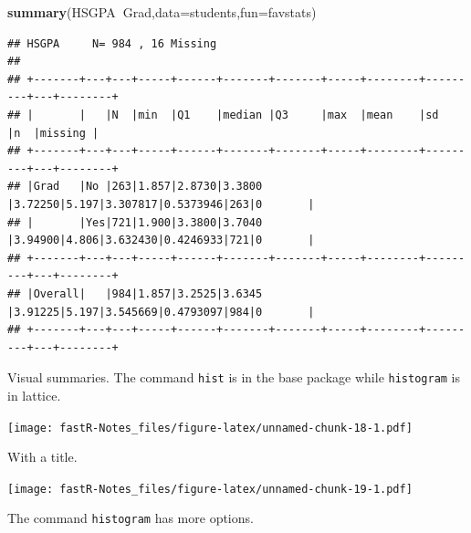 \documentclass[]{book}
\newenvironment{Shaded}{\begin{snugshade}}{\end{snugshade}}
\newcommand{\KeywordTok}[1]{\textcolor[rgb]{0.13,0.29,0.53}{\textbf{#1}}}
\newcommand{\DataTypeTok}[1]{\textcolor[rgb]{0.13,0.29,0.53}{#1}}
\newcommand{\StringTok}[1]{\textcolor[rgb]{0.31,0.60,0.02}{#1}}
\newcommand{\OperatorTok}[1]{\textcolor[rgb]{0.81,0.36,0.00}{\textbf{#1}}}
\newcommand{\NormalTok}[1]{#1}
\theoremstyle{definition}
\theoremstyle{definition}
\theoremstyle{definition}
\theoremstyle{remark}
\begin{document}
\begin{Shaded}
\begin{Highlighting}[]
\KeywordTok{summary}\NormalTok{(HSGPA}\OperatorTok{~}\NormalTok{Grad,}\DataTypeTok{data=}\NormalTok{students,}\DataTypeTok{fun=}\NormalTok{favstats)}
\end{Highlighting}
\end{Shaded}

\begin{verbatim}
## HSGPA     N= 984 , 16 Missing 
## 
## +-------+---+---+-----+------+-------+-------+-----+--------+---------+---+--------+
## |       |   |N  |min  |Q1    |median |Q3     |max  |mean    |sd       |n  |missing |
## +-------+---+---+-----+------+-------+-------+-----+--------+---------+---+--------+
## |Grad   |No |263|1.857|2.8730|3.3800 |3.72250|5.197|3.307817|0.5373946|263|0       |
## |       |Yes|721|1.900|3.3800|3.7040 |3.94900|4.806|3.632430|0.4246933|721|0       |
## +-------+---+---+-----+------+-------+-------+-----+--------+---------+---+--------+
## |Overall|   |984|1.857|3.2525|3.6345 |3.91225|5.197|3.545669|0.4793097|984|0       |
## +-------+---+---+-----+------+-------+-------+-----+--------+---------+---+--------+
\end{verbatim}

Visual summaries. The command \texttt{hist} is in the base package while
\texttt{histogram} is in lattice.

\begin{Shaded}
\end{Shaded}

\texttt{[image: fastR-Notes\_files/figure-latex/unnamed-chunk-18-1.pdf]}

With a title.

\begin{Shaded}
\end{Shaded}

\texttt{[image: fastR-Notes\_files/figure-latex/unnamed-chunk-19-1.pdf]}

The command \texttt{histogram} has more options.

\begin{Shaded}
\end{Shaded}
\end{document}
